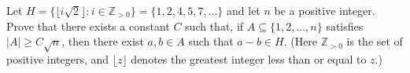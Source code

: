 Let $H = \{ \lfloor i\sqrt{2}\rfloor : i \in \mathbb Z_{>0}\} = \{1,2,4,5,7,\dots \}$ and let $n$ be a positive integer. Prove that there exists a constant $C$ such that, if $A\subseteq \{1,2,\dots, n\}$ satisfies $|A| \ge C\sqrt{n}$, then there exist $a,b\in A$ such that $a-b\in H$. (Here $\mathbb Z_{>0}$ is the set of positive integers, and $\lfloor z\rfloor$ denotes the greatest integer less than or equal to $z$.)